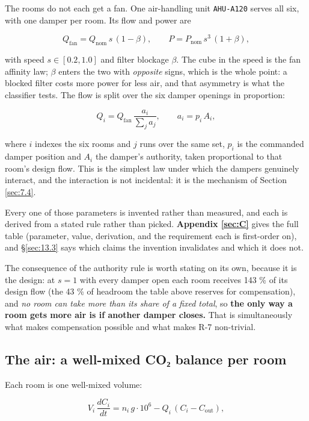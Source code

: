 The rooms do not each get a fan. One air-handling unit \texttt{AHU-A120} serves all six, with one
damper per room. Its flow and power are

\[ Q_\text{fan} = Q_\text{nom}\,s\,(1-\beta), \qquad P = P_\text{nom}\,s^3\,(1+\beta), \]

with speed $s \in [0.2, 1.0]$ and filter blockage $\beta$. The cube in the speed is the fan
affinity law; $\beta$ enters the two with \emph{opposite} signs, which is the whole point: a
blocked filter costs more power for less air, and that asymmetry is what the classifier tests. The
flow is split over the six damper openings in proportion:

\[ Q_i = Q_\text{fan}\,\frac{a_i}{\sum_j a_j}, \qquad a_i = p_i\,A_i, \]

where $i$ indexes the six rooms and $j$ runs over the same set, $p_i$ is the commanded damper
position and $A_i$ the damper's authority, taken proportional to that room's design flow. This is the simplest law under which the dampers genuinely interact,
and the interaction is not incidental: it is the mechanism of Section \ref{sec:7.4}.

Every one of those parameters is invented rather than measured, and each is derived from a stated
rule rather than picked. \textbf{Appendix \ref{sec:C}} gives the full table (parameter, value, derivation,
and the requirement each is first-order on), and §\ref{sec:13.3} says which claims the invention invalidates
and which it does not.

The consequence of the authority rule is worth stating on its own, because it is the design: at
$s=1$ with every damper open each room receives 143 \% of its design flow (the 43 \% of
headroom the table above reserves for compensation), and \emph{no room can take more than its share
of a fixed total}, so \textbf{the only way a room gets more air is if another damper closes.} That is simultaneously what
makes compensation possible and what makes R-7 non-trivial.

\subsection{The air: a well-mixed CO₂ balance per room}\label{sec:6.3}

Each room is one well-mixed volume:

\[ V_i\,\frac{dC_i}{dt} = n_i\,g\cdot 10^{6} - Q_i\,(C_i - C_\text{out}), \]

